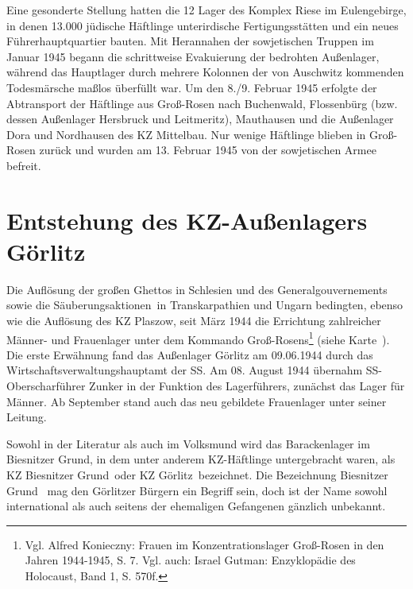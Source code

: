 \documentclass[a4paper,12pt,ngerman,
]{nisebook}
\begin{document}
\begin{fshaded}
Eine gesonderte Stellung hatten die 12 Lager des Komplex Riese im Eulengebirge, in denen 13.000 jüdische Häftlinge unterirdische Fertigungsstätten und ein neues Führerhauptquartier bauten. Mit Herannahen der sowjetischen Truppen im Januar 1945 begann die schrittweise Evakuierung der bedrohten Außenlager, während das Hauptlager durch mehrere Kolonnen der von Auschwitz kommenden Todesmärsche maßlos überfüllt war. Um den 8./9. Februar 1945 erfolgte der Abtransport der Häftlinge aus Groß-Rosen nach Buchenwald, Flossenbürg (bzw. dessen Außenlager Hersbruck und Leitmeritz), Mauthausen und die Außenlager Dora und Nordhausen des KZ Mittelbau. Nur wenige Häftlinge blieben in Groß-Rosen zurück und wurden am 13. Februar 1945 von der sowjetischen Armee befreit.
\end{fshaded}



\section{Entstehung des KZ-Außenlagers Görlitz}
Die Auflösung der großen Ghettos in Schlesien und des Generalgouvernements sowie die \glqq Säuberungsaktionen\grqq~in Transkarpathien und Ungarn bedingten, ebenso wie die Auflösung des KZ Plaszow, seit März 1944 die Errichtung zahlreicher Männer- und Frauenlager unter dem Kommando Groß-Rosens\footnote{Vgl. Alfred Konieczny: Frauen im Konzentrationslager Groß-Rosen in den Jahren 1944-1945, S. 7. Vgl. auch: Israel Gutman: Enzyklopädie des Holocaust, Band 1, S. 570f.} (siehe Karte~). Die erste Erwähnung fand das Außenlager Görlitz am 09.06.1944 durch das Wirtschaftsverwaltungshauptamt der SS. Am 08. August 1944 übernahm SS-Oberscharführer Zunker in der Funktion des Lagerführers, zunächst das Lager für Männer. Ab September stand auch das neu gebildete Frauenlager unter seiner Leitung.\newline

Sowohl in der Literatur als auch im Volksmund wird das Barackenlager im Biesnitzer Grund, in dem unter anderem KZ-Häftlinge untergebracht waren, als \glqq KZ Biesnitzer Grund\grqq~\linebreak oder \glqq KZ Görlitz\grqq~bezeichnet.
Die Bezeichnung \glqq Biesnitzer Grund\grqq~ mag den Görlitzer Bürgern ein Begriff sein, doch ist der Name sowohl international als auch seitens der ehemaligen Gefangenen gänzlich unbekannt.\newline
\end{document}
